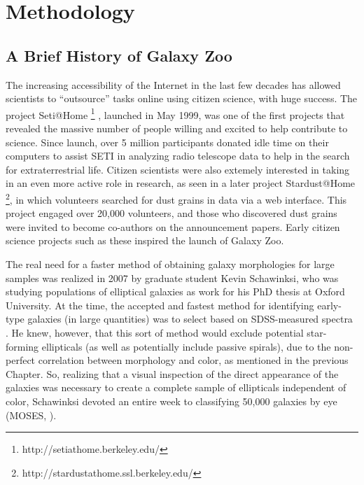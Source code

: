 \chapter{Methodology}
\label{chap:methodology}

\section{A Brief History of Galaxy Zoo}

The increasing accessibility of the Internet in the last few decades has allowed scientists to ``outsource'' tasks online using citizen science, with huge success. The project Seti@Home \footnote{http://setiathome.berkeley.edu/} \citep{Anderson2002}, launched in May 1999, was one of the first projects that revealed the massive number of people willing and excited to help contribute to science. Since launch, over 5 million participants donated idle time on their computers to assist SETI in analyzing radio telescope data to help in the search for extraterrestrial life. Citizen scientists were also extemely interested in taking in an even more active role in research, as seen in a later project Stardust@Home \footnote{http://stardustathome.ssl.berkeley.edu/}, in which volunteers searched for dust grains in data via a web interface. This project engaged over 20,000 volunteers, and those who discovered dust grains were invited to become co-authors on the announcement papers. Early citizen science projects such as these inspired the launch of Galaxy Zoo.

The real need for a faster method of obtaining galaxy morphologies for large samples was realized in 2007 by graduate student Kevin Schawinksi, who was studying populations of elliptical galaxies as work for his PhD thesis at Oxford University. At the time, the accepted and fastest method for identifying early-type galaxies (in large quantities) was to select based on SDSS-measured spectra \citep{Bernardi2003}. He knew, however, that this sort of method would exclude potential star-forming ellipticals (as well as potentially include passive spirals), due to the non-perfect correlation between morphology and color, as mentioned in the previous Chapter. So, realizing that a visual inspection of the direct appearance of the galaxies was necessary to create a complete sample of ellipticals independent of color, Schawinksi devoted an entire week to classifying 50,000 galaxies by eye (MOSES, \citet{Schawinski2007}). 


